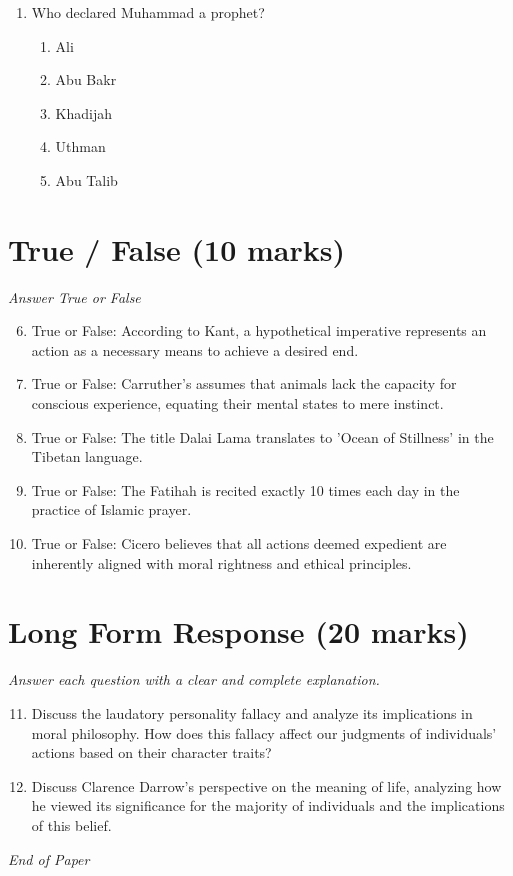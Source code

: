 \documentclass[12pt]{article}
\begin{document}
\begin{enumerate}[label=\arabic*.]
\begin{enumerate}[label=(\alph*)]
    \item \textasciitilde{}Mis
    \item Msi\textasciitilde{}
    \item M\textasciitilde{}ism
    \item \textasciitilde{}Mmis
    \item M\textasciitilde{}mis
\end{enumerate}
\item Who declared Muhammad a prophet?
\begin{enumerate}[label=(\alph*)]
    \item Ali
    \item Abu Bakr
    \item Khadijah
    \item Uthman
    \item Abu Talib
\end{enumerate}
\end{enumerate}

\section*{True / False (10 marks)}
\textit{Answer True or False}
\begin{enumerate}[label=\arabic*.]
\setcounter{enumi}{5}
\item True or False: According to Kant, a hypothetical imperative represents an action as a necessary means to achieve a desired end.
\item True or False: Carruther's assumes that animals lack the capacity for conscious experience, equating their mental states to mere instinct.
\item True or False: The title Dalai Lama translates to 'Ocean of Stillness' in the Tibetan language.
\item True or False: The Fatihah is recited exactly 10 times each day in the practice of Islamic prayer.
\item True or False: Cicero believes that all actions deemed expedient are inherently aligned with moral rightness and ethical principles.
\end{enumerate}

\section*{Long Form Response (20 marks)}
\textit{Answer each question with a clear and complete explanation.}
\begin{enumerate}[label=\arabic*.]
\setcounter{enumi}{10}
\item Discuss the laudatory personality fallacy and analyze its implications in moral philosophy. How does this fallacy affect our judgments of individuals' actions based on their character traits?
\item Discuss Clarence Darrow's perspective on the meaning of life, analyzing how he viewed its significance for the majority of individuals and the implications of this belief.
\end{enumerate}

\vfill
\noindent\textit{End of Paper}
\end{document}
